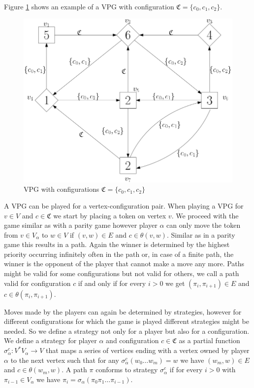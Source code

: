 \begin{example}
	Figure \ref{fig:vpg_basicex} shows an example of a VPG with configuration $\mathfrak{C} = \{c_0,c_1,c_2\}$.
	\begin{figure}[h]
		\centering
		\includegraphics[scale=0.3]{Examples/VPG/Basic}
		\caption{VPG with configurations $\mathfrak{C} = \{c_0,c_1,c_2\}$}
		\label{fig:vpg_basicex}
	\end{figure}
\end{example}

A VPG can be played for a vertex-configuration pair. When playing a VPG for $v\in V$ and $c \in \mathfrak{C}$ we start by placing a token on vertex $v$. We proceed with the game similar as with a parity game however player $\alpha$ can only move the token from $v \in V_\alpha$ to $w \in V$ if $(v,w) \in E$ and $c \in \theta(v,w)$. Similar as in a parity game this results in a path. Again the winner is determined by the highest priority occurring infinitely often in the path or, in case of a finite path, the winner is the opponent of the player that cannot make a move any more. Paths might be valid for some configurations but not valid for others, we call a path valid for configuration $c$ if and only if for every $i > 0$ we get $(\pi_{i},\pi_{i+1}) \in E$ and $c \in \theta(\pi_{i},\pi_{i+1})$.

Moves made by the players can again be determined by strategies, however for different configurations for which the game is played different strategies might be needed. So we define a strategy not only for a player but also for a configuration. We define a strategy for player $\alpha$ and configuration $c \in \mathfrak{C}$ as a partial function $\sigma_\alpha^c : V^*V_\alpha \rightarrow V$ that maps a series of vertices ending with a vertex owned by player $\alpha$ to the next vertex such that for any $\sigma_\alpha^c(w_0\dots w_m) = w$ we have $(w_m,w) \in E$ and $c \in \theta(w_m,w)$. A path $\pi$ conforms to strategy $\sigma_\alpha^c$ if for every $i > 0$ with $\pi_{i-1}\in V_\alpha$ we have $\pi_i = \sigma_\alpha(\pi_0\pi_1\dots\pi_{i-1})$.

